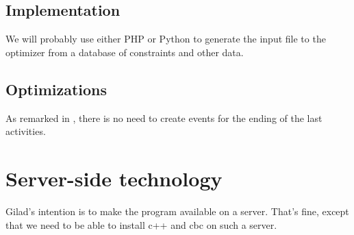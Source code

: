 \documentclass[11pt]{amsart}
\numberwithin{equation}{section}
\begin{document}
\subsection{Implementation}

We will probably use either PHP or Python to generate the input file to the optimizer from
a database of constraints and other data.

\subsection{Optimizations}
As remarked in \cite{artigues-etal11}, there is no need to create
events for the ending of the last activities. 

\section{Server-side technology}

Gilad's intention is to make the program available on a server. That's
fine, except that we need to be able to install c++ and cbc on such a server.



\end{document}
